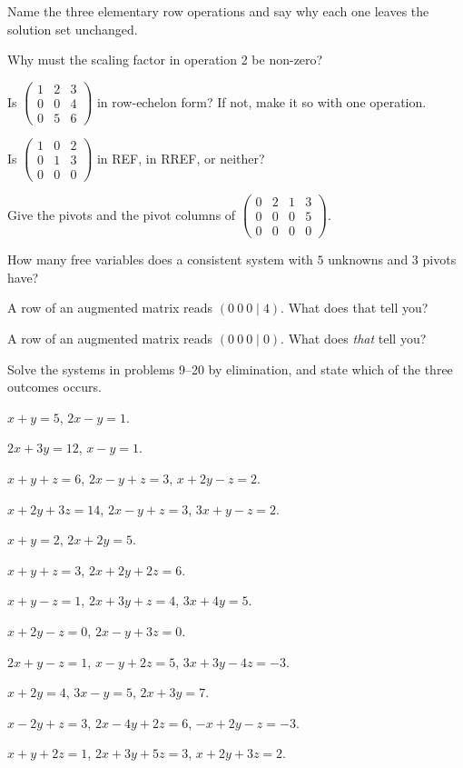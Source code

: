 \begin{problems}
  \item Name the three elementary row operations and say why each one
        leaves the solution set unchanged.
  \item Why must the scaling factor in operation 2 be non-zero?
  \item Is $\begin{pmatrix}1&2&3\\0&0&4\\0&5&6\end{pmatrix}$ in row-echelon
        form? If not, make it so with one operation.
  \item Is $\begin{pmatrix}1&0&2\\0&1&3\\0&0&0\end{pmatrix}$ in REF, in
        RREF, or neither?
  \item Give the pivots and the pivot columns of
        $\begin{pmatrix}0&2&1&3\\0&0&0&5\\0&0&0&0\end{pmatrix}$.
  \item How many free variables does a consistent system with $5$ unknowns
        and $3$ pivots have?
  \item A row of an augmented matrix reads $(0\ 0\ 0\mid 4)$. What does that
        tell you?
  \item A row of an augmented matrix reads $(0\ 0\ 0\mid 0)$. What does
        \emph{that} tell you?
\end{problems}

Solve the systems in problems 9--20 by elimination, and state which of the
three outcomes occurs.

\begin{problems}[resume]
  \item $x+y=5$, \;$2x-y=1$.
  \item $2x+3y=12$, \;$x-y=1$.
  \item $x+y+z=6$, \;$2x-y+z=3$, \;$x+2y-z=2$.
  \item $x+2y+3z=14$, \;$2x-y+z=3$, \;$3x+y-z=2$.
  \item $x+y=2$, \;$2x+2y=5$.
  \item $x+y+z=3$, \;$2x+2y+2z=6$.
  \item $x+y-z=1$, \;$2x+3y+z=4$, \;$3x+4y=5$.
  \item $x+2y-z=0$, \;$2x-y+3z=0$.
  \item $2x+y-z=1$, \;$x-y+2z=5$, \;$3x+3y-4z=-3$.
  \item $x+2y=4$, \;$3x-y=5$, \;$2x+3y=7$.
  \item $x-2y+z=3$, \;$2x-4y+2z=6$, \;$-x+2y-z=-3$.
  \item $x+y+2z=1$, \;$2x+3y+5z=3$, \;$x+2y+3z=2$.
\end{problems}

